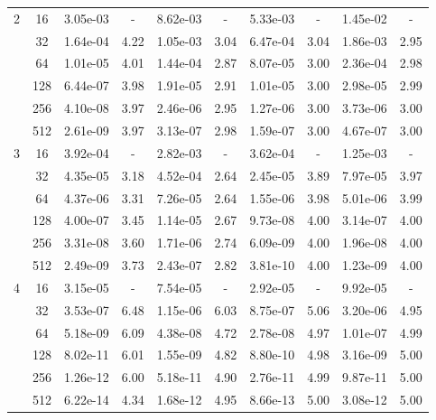 \begin{table}[htbp]
\begin{center}
\begin{tabular}{| c | c | c c | c c | c c | c c |}
			\hline

			2	& 16 & 3.05e-03 & - & 8.62e-03 & - & 5.33e-03 & - & 1.45e-02 & - \\
				& 32 & 1.64e-04 & 4.22 & 1.05e-03 & 3.04 & 6.47e-04 & 3.04 & 1.86e-03 & 2.95 \\
				& 64 & 1.01e-05 & 4.01 & 1.44e-04 & 2.87 & 8.07e-05 & 3.00 & 2.36e-04 & 2.98 \\
				& 128 & 6.44e-07 & 3.98 & 1.91e-05 & 2.91 & 1.01e-05 & 3.00 & 2.98e-05 & 2.99 \\
				& 256 & 4.10e-08 & 3.97 & 2.46e-06 & 2.95 & 1.27e-06 & 3.00 & 3.73e-06 & 3.00 \\
				& 512 & 2.61e-09 & 3.97 & 3.13e-07 & 2.98 & 1.59e-07 & 3.00 & 4.67e-07 & 3.00 \\

			\hline

			3	& 16 & 3.92e-04 & - & 2.82e-03 & - & 3.62e-04 & - & 1.25e-03 & - \\
				& 32 & 4.35e-05 & 3.18 & 4.52e-04 & 2.64 & 2.45e-05 & 3.89 & 7.97e-05 & 3.97 \\
				& 64 & 4.37e-06 & 3.31 & 7.26e-05 & 2.64 & 1.55e-06 & 3.98 & 5.01e-06 & 3.99 \\
				& 128 & 4.00e-07 & 3.45 & 1.14e-05 & 2.67 & 9.73e-08 & 4.00 & 3.14e-07 & 4.00 \\
				& 256 & 3.31e-08 & 3.60 & 1.71e-06 & 2.74 & 6.09e-09 & 4.00 & 1.96e-08 & 4.00 \\
				& 512 & 2.49e-09 & 3.73 & 2.43e-07 & 2.82 & 3.81e-10 & 4.00 & 1.23e-09 & 4.00 \\

			\hline

			4	& 16 & 3.15e-05 & - & 7.54e-05 & - & 2.92e-05 & - & 9.92e-05 & - \\
				& 32 & 3.53e-07 & 6.48 & 1.15e-06 & 6.03 & 8.75e-07 & 5.06 & 3.20e-06 & 4.95 \\
				& 64 & 5.18e-09 & 6.09 & 4.38e-08 & 4.72 & 2.78e-08 & 4.97 & 1.01e-07 & 4.99 \\
				& 128 & 8.02e-11 & 6.01 & 1.55e-09 & 4.82 & 8.80e-10 & 4.98 & 3.16e-09 & 5.00 \\
				& 256 & 1.26e-12 & 6.00 & 5.18e-11 & 4.90 & 2.76e-11 & 4.99 & 9.87e-11 & 5.00 \\
				& 512 & 6.22e-14 & 4.34 & 1.68e-12 & 4.95 & 8.66e-13 & 5.00 & 3.08e-12 & 5.00 \\

			\hline
		\end{tabular}
	\end{center}
\end{table}

